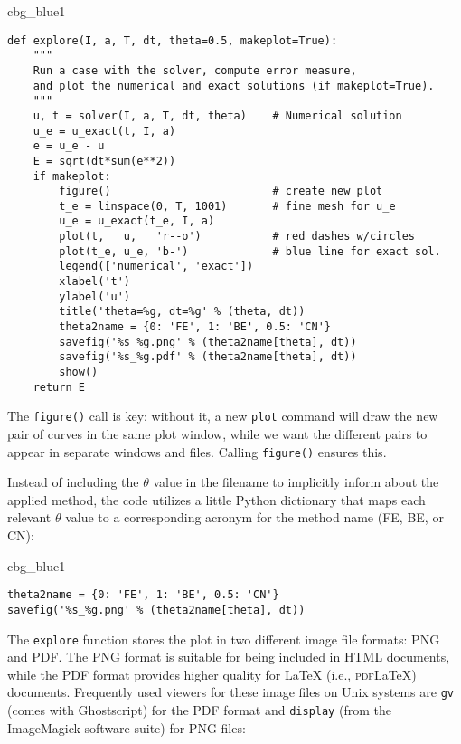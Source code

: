 \documentclass[graybox,sectrefs,envcountresetchap,open=right,final]{svmonodo}
\newenvironment{_cod_tight}[1]{
   \def\FrameCommand{\colorbox{#1}}
   \FrameRule0.6pt\MakeFramed {\FrameRestore}\vskip3mm}
   {\vskip0mm\endMakeFramed}
\newenvironment{cod}[1]{
\bgroup\rmfamily
\fboxsep=0mm\relax
\begin{_cod_tight}{#1}
\list{}{\parsep=-2mm\parskip=0mm\topsep=0pt\leftmargin=2mm
\rightmargin=2\leftmargin\leftmargin=4pt\relax}
\item\relax}
{\endlist\end{_cod_tight}\egroup}
\begin{document}
\begin{cod}{cbg_blue1}\begin{Verbatim}[numbers=none,fontsize=\fontsize{9pt}{9pt},baselinestretch=0.95,xleftmargin=2mm]
def explore(I, a, T, dt, theta=0.5, makeplot=True):
    """
    Run a case with the solver, compute error measure,
    and plot the numerical and exact solutions (if makeplot=True).
    """
    u, t = solver(I, a, T, dt, theta)    # Numerical solution
    u_e = u_exact(t, I, a)
    e = u_e - u
    E = sqrt(dt*sum(e**2))
    if makeplot:
        figure()                         # create new plot
        t_e = linspace(0, T, 1001)       # fine mesh for u_e
        u_e = u_exact(t_e, I, a)
        plot(t,   u,   'r--o')           # red dashes w/circles
        plot(t_e, u_e, 'b-')             # blue line for exact sol.
        legend(['numerical', 'exact'])
        xlabel('t')
        ylabel('u')
        title('theta=%g, dt=%g' % (theta, dt))
        theta2name = {0: 'FE', 1: 'BE', 0.5: 'CN'}
        savefig('%s_%g.png' % (theta2name[theta], dt))
        savefig('%s_%g.pdf' % (theta2name[theta], dt))
        show()
    return E
\end{Verbatim}
\end{cod}
\noindent

The \texttt{figure()} call is key: without it, a new \texttt{plot} command will
draw the new pair of curves in the same plot window, while we want
the different pairs to appear in separate windows and files.
Calling \texttt{figure()} ensures this.

Instead of including the $\theta$ value in the filename to implicitly
inform about the applied method, the code utilizes a little Python
dictionary that maps each relevant $\theta$ value to a corresponding
acronym for the method name (FE, BE, or CN):

\begin{cod}{cbg_blue1}\begin{Verbatim}[numbers=none,fontsize=\fontsize{9pt}{9pt},baselinestretch=0.95,xleftmargin=2mm]
theta2name = {0: 'FE', 1: 'BE', 0.5: 'CN'}
savefig('%s_%g.png' % (theta2name[theta], dt))
\end{Verbatim}
\end{cod}
\noindent

  

The \texttt{explore} function stores the plot in two different image file formats:
PNG and PDF. The PNG format is suitable for
being included in HTML documents, while the PDF format provides
higher quality for {\LaTeX} (i.e., \textsc{pdf}{\LaTeX}) documents.
Frequently used viewers for these
image files on Unix systems are \texttt{gv} (comes with Ghostscript)
for the PDF format and
\texttt{display} (from the ImageMagick software suite) for PNG files:
\end{document}
